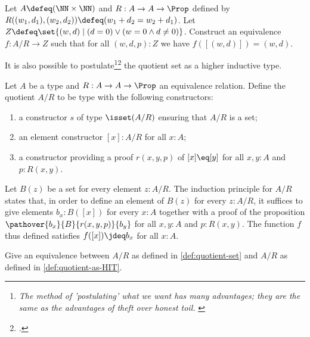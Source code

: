 \begin{xca}\label{xca:ints-as-quotient}
Let $A\defeq(\NN\times\NN)$ and $R: A\to A\to\Prop$ defined by
$R((w_1,d_1),(w_2,d_2)) \defeq  (w_1+d_2 = w_2 + d_1)$.
Let $Z \defeq \set{(w,d)\mid (d=0) \lor (w=0 \land d\ne 0)}$.
Construct an equivalence $f: A/R\to Z$ such that for all
$(w,d,p):Z$ we have $f([(w,d)]) = (w,d)$.
\end{xca}

It is also possible to postulate\footnote{%
\emph{The method of 'postulating' what we want has many advantages;
  they are the same as the advantages of theft over honest toil.}\hfill
\citeauthor{russell-intro-mp}\footnotemark{}}\footcitetext{russell-intro-mp}
the quotient set as a higher inductive type.

\begin{definition}\label{def:quotient-as-HIT}
  Let $A$ be a type and $R : A \to A \to \Prop$ an equivalence relation.
  Define the quotient $A/R$ to be type with the following constructors:
  \begin{enumerate}
  \item a constructor $s$ of type $\isset(A/R)$ ensuring that $A/R$ is a set;
  \item an element constructor $[x] : A/R$ for all $x:A$;
  \item a constructor providing a proof $r(x,y,p)$ of
  $[x] \eq [y]$ for all $x,y : A$ and $p:R(x,y)$.
  \end{enumerate}
  Let $B(z)$ be a set for every element $z:A/R$. The induction principle
  for $A/R$ states that, in order to define an element of $B(z)$
  for every $z:A/R$,
  it suffices to give elements $b_x : B([x])$ for every $x:A$
  together with a proof of the proposition
  $\pathover{b_x}{B}{r(x,y,p)}{b_y}$ for all $x,y:A$ and $p:R(x,y)$.
  The function $f$ thus defined satisfies $f([x])\jdeq b_x$ for all $x:A$.
\end{definition}

\begin{xca}\label{xca:quotients-equivalence}
Give an equivalence between $A/R$ as defined in \cref{def:quotient-set}
and $A/R$ as defined in \cref{def:quotient-as-HIT}.
\end{xca}

